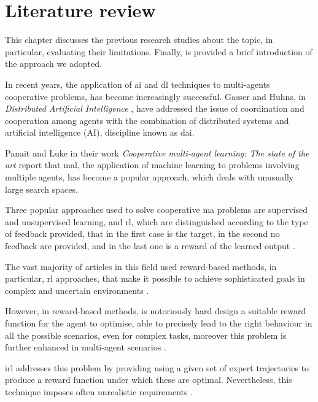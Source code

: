 \chapter{Literature review}
\label{chap:stateoftheart}
This chapter discusses the previous research studies about the topic, in particular, 
evaluating their limitations. Finally, is provided a brief introduction of the 
approach we adopted.


In recent years, the application of \gls{ai} and \gls{dl} techniques to multi-agents 
cooperative problems, has become increasingly successful.
Gasser and Huhns, in \emph{Distributed Artificial Intelligence} 
\cite[see][]{gasser2014distributed}, have addressed the issue of coordination and 
cooperation among agents with the combination of distributed systems and 
artificial intelligence (AI), discipline known as \gls{dai}.

Panait and Luke in their work \emph{Cooperative multi-agent learning: The state 
of the art} \cite[][]{panait2005cooperative} report that \gls{mal}, the application 
of machine learning to problems involving multiple agents, has become a popular 
approach, which deals with unusually large search spaces. 

Three popular approaches used to solve cooperative \gls{ma} problems are 
supervised and unsupervised learning, and \gls{rl}, which are distinguished 
according to the type of feedback provided, that in the first case is the target, in 
the second no feedback are provided, and in the last one is a reward of the 
learned output \cite[][]{panait2005cooperative}.

The vast majority of articles in this field used reward-based methods, in particular, 
\gls{rl} approaches, that make it possible to achieve sophisticated goals in 
complex and uncertain environments \cite[][]{oliehoek2012decentralised}. 

However, in reward-based methods, is notoriously hard design a suitable reward 
function for the agent to optimise, able to precisely lead to the right behaviour in 
all the possible scenarios, even for complex tasks, moreover this problem is 
further enhanced in multi-agent scenarios \cite[][]{hadfield2017inverse, 
oliehoek2012decentralised}.

\gls{irl} addresses this problem by providing using a given set of expert 
trajectories to produce a reward function under which these are optimal. 
Nevertheless, this technique imposes often unrealistic requirements 
\cite[][]{vsovsic2016inverse}.

